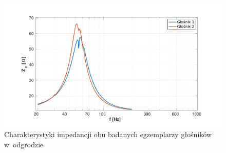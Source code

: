 \documentclass[12pt]{oska}
\begin{document}
	\begin{figure}[!ht]
		\centering
		\includegraphics[width=.8\textwidth,trim={2cm .5cm 2cm 1cm},clip]{porownanie_glosnikow.pdf}
		\caption{Charakterystyki impedancji obu badanych egzemplarzy głośników w~odgrodzie}
		\label{r:2glosniki}
	\end{figure}
	
\end{document}
